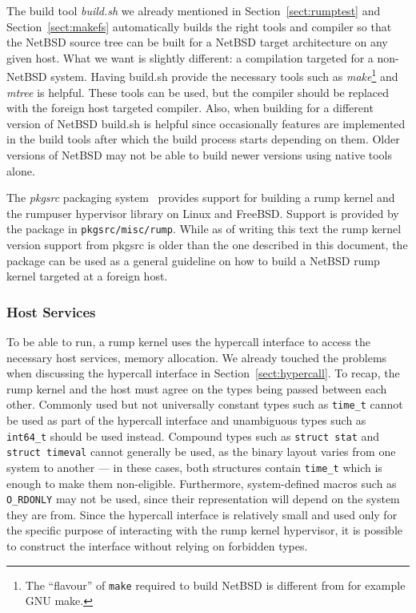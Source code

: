 The build tool \textit{build.sh} we already mentioned in
Section~\ref{sect:rumptest} and Section~\ref{sect:makefs} automatically
builds the right tools and compiler so that the NetBSD source tree
can be built for a NetBSD target architecture on any given host.
What we want is slightly different: a compilation targeted for a
non-NetBSD system.  Having build.sh provide the necessary
tools such as \textit{make}\footnote
{
	The ``flavour'' of \texttt{make} required to build NetBSD
	is different from for example GNU make.
}
and \textit{mtree} is helpful.  These tools can be used, but the
compiler should be replaced with the foreign host targeted compiler.
Also, when building for a different version of NetBSD build.sh is
helpful since occasionally features are implemented in the build
tools after which the build process starts depending on them.
Older versions of NetBSD may not be able to build newer versions
using native tools alone.

The \textit{pkgsrc} packaging system~\cite{pkgsrc} provides support
for building a rump kernel and the rumpuser hypervisor library on
Linux and FreeBSD.  Support is provided by the package in
\texttt{pkgsrc/misc/rump}.  While as of writing this text the rump kernel
version support from pkgsrc is older than the one described in this
document, the package can be used as a general guideline on how to
build a NetBSD rump kernel targeted at a foreign host.

\subsubsection*{Host Services}

To be able to run, a rump kernel uses the hypercall interface to
access the necessary host services, \eg memory allocation.
We already touched the problems when discussing the hypercall
interface in Section~\ref{sect:hypercall}.  To recap, the rump
kernel and the host must agree on the types being passed between
each other.  Commonly used but not universally constant types such
as \verb+time_t+ cannot be used as part of the hypercall interface
and unambiguous types such as \verb+int64_t+ should be used instead.
Compound types such as \verb+struct stat+ and \verb+struct timeval+
cannot generally be used, as the binary layout varies from one system
to another --- in these cases, both structures contain \verb+time_t+
which is enough to make them non-eligible.  Furthermore, system-defined
macros such as \verb+O_RDONLY+ may not be used, since their
representation will depend on the system they are from.  Since the
hypercall interface is relatively small and used only for the
specific purpose of interacting with the rump kernel hypervisor,
it is possible to construct the interface without relying on forbidden types.

